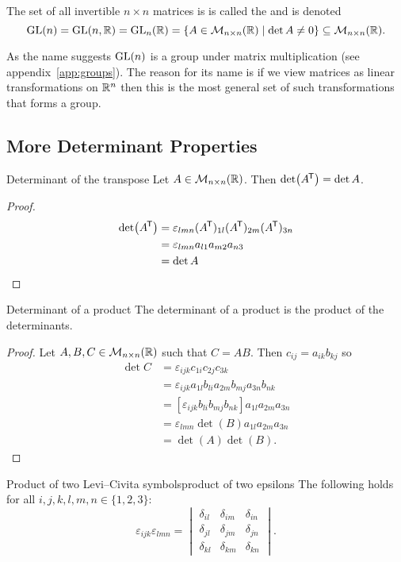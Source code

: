 \begin{notation*}{}
    The set of all invertible \(n\times n\) matrices is is called the  and is denoted
    \[\mathrm{GL}(n) = \mathrm{GL}(n, \mathbb{R}) = \mathrm{GL}_n(\mathbb{R}) = \{A\in\mathcal{M}_{{n}\times{n}}({\mathbb{R}})\mid \det A \ne 0\} \subseteq \mathcal{M}_{{n}\times{n}}({\mathbb{R}}).\]
\end{notation*}
As the name suggests \(\mathrm{GL}(n)\) is a group under matrix multiplication (see appendix~\ref{app:groups}).
The reason for its name is if we view matrices as linear transformations on \(\mathbb{R}^n\) then this is the most general set of such transformations that forms a group.

\subsection{More Determinant Properties}
\begin{lemma}{Determinant of the transpose}{}
    Let \(A\in\mathcal{M}_{{n}\times{n}}({\mathbb{R}})\).
    Then \(\det(A^{\mkern-1.5mu\mathsf{T}}) = \det A\).
\end{lemma}
\begin{proof}
    \begin{align*}
        \det(A^{\mkern-1.5mu\mathsf{T}}) &= \varepsilon_{lmn}(A^{\mkern-1.5mu\mathsf{T}})_{1l}(A^{\mkern-1.5mu\mathsf{T}})_{2m}(A^{\mkern-1.5mu\mathsf{T}})_{3n}\\
        &= \varepsilon_{lmn}a_{l1}a_{m2}a_{n3}\\
        &= \det A
    \end{align*}
\end{proof}
\begin{lemma}{Determinant of a product}{}
    The determinant of a product is the product of the determinants.
\end{lemma}
\begin{proof}
    Let \(A, B, C\in\mathcal{M}_{{n}\times{n}}({\mathbb{R}})\) such that \(C = AB\).
    Then \(c_{ij} = a_{ik}b_{kj}\) so
    \begin{align*}
        \det C &= \varepsilon_{ijk}c_{1i}c_{2j}c_{3k}\\
        &= \varepsilon_{ijk}a_{1l}b_{li}a_{2m}b_{mj}a_{3n}b_{nk}\\
        &= [\varepsilon_{ijk}b_{li}b_{mj}b_{nk}]a_{1l}a_{2m}a_{3n}\\
        &= \varepsilon_{lmn}\det(B) a_{1l}a_{2m}a_{3n}\\
        &= \det(A)\det(B).
    \end{align*}
\end{proof}
\begin{lemma}{Product of two Levi--Civita symbols}{product of two epsilons}
    The following holds for all \(i, j, k, l, m, n\in\{1, 2, 3\}\):
    \[
    \varepsilon_{ijk}\varepsilon_{lmn} =
    \begin{vmatrix}
        \delta_{il} & \delta_{im} & \delta_{in}\\
        \delta_{jl} & \delta_{jm} & \delta_{jn}\\
        \delta_{kl} & \delta_{km} & \delta_{kn}
    \end{vmatrix}
    .
    \]
\end{lemma}
